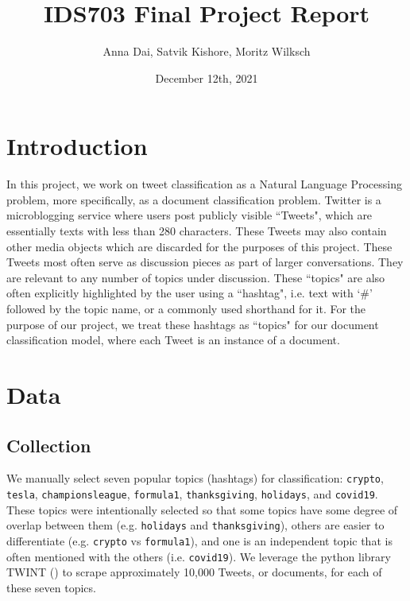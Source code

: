 \documentclass[11pt]{article}
\title{\vspace{-1.5cm}IDS703 Final Project Report}
\author{Anna Dai, Satvik Kishore, Moritz Wilksch}
\date{December 12th, 2021}
\begin{document}
\maketitle

\section{Introduction}

In this project, we work on tweet classification as a Natural Language Processing problem, more specifically, as a document classification problem. Twitter is a microblogging service where users post publicly visible ``Tweets", which are essentially texts with less than 280 characters. These Tweets may also contain other media objects which are discarded for the purposes of this project. These Tweets most often serve as discussion pieces as part of larger conversations. They are relevant to any number of topics under discussion. These ``topics" are also often explicitly highlighted by the user using a ``hashtag", i.e. text with `\#' followed by the topic name, or a commonly used shorthand for it. For the purpose of our project, we treat these hashtags as ``topics" for our document classification model, where each Tweet is an instance of a document.

\section{Data}

\subsection{Collection}
We manually select seven popular topics (hashtags) for classification: \texttt{crypto}, \texttt{tesla}, \texttt{championsleague}, \texttt{formula1}, \texttt{thanksgiving}, \texttt{holidays}, and \texttt{covid19}. These topics were intentionally selected so that some topics have some degree of overlap between them (e.g. \texttt{holidays} and \texttt{thanksgiving}), others are easier to differentiate (e.g. \texttt{crypto} vs \texttt{formula1}), and one is an independent topic that is often mentioned with the others (i.e. \texttt{covid19}). We leverage the python library TWINT (\cite{twint}) to scrape approximately 10,000 Tweets, or documents, for each of these seven topics.
\end{document}
